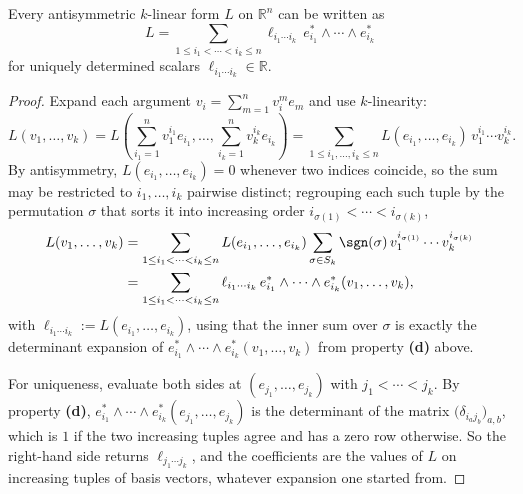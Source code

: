 \begin{proposition}
\label{prop:k_form_basis_expansion}
Every antisymmetric $k$-linear form $L$ on $\mathbb{R}^n$ can be written as
\[L = \sum_{1\leq i_1<\cdots<i_k\leq n} \ell_{i_1\cdots i_k}\,e_{i_1}^*\wedge\cdots\wedge
  e_{i_k}^*\]
for uniquely determined scalars $\ell_{i_1\cdots i_k} \in \mathbb{R}$.
\end{proposition}

\begin{proof}
Expand each argument $v_i = \sum_{m=1}^n v_i^m e_m$ and use $k$-linearity:
\[L(v_1,\ldots,v_k) = L\!\left(\sum_{i_1=1}^n v_1^{i_1}e_{i_1},\ldots,\sum_{i_k=1}^n
  v_k^{i_k}e_{i_k}\right) = \sum_{1\leq i_1,\ldots,i_k\leq n} L(e_{i_1},\ldots,e_{i_k})\,
  v_1^{i_1}\cdots v_k^{i_k}.\]
By antisymmetry, $L(e_{i_1},\ldots,e_{i_k}) = 0$ whenever two indices coincide, so the sum may
be restricted to $i_1,\ldots,i_k$ pairwise distinct; regrouping each such tuple by the
permutation $\sigma$ that sorts it into increasing order $i_{\sigma(1)}<\cdots<i_{\sigma(k)}$,
\begin{align}
L(v_1,\ldots,v_k) &= \sum_{1\leq i_1<\cdots<i_k\leq n} L(e_{i_1},\ldots,e_{i_k})
  \sum_{\sigma\in S_k} \sgn(\sigma)\,v_1^{i_{\sigma(1)}}\cdots v_k^{i_{\sigma(k)}} \nonumber \\
  &= \sum_{1\leq i_1<\cdots<i_k\leq n} \ell_{i_1\cdots i_k}\,e_{i_1}^*\wedge\cdots\wedge
  e_{i_k}^*(v_1,\ldots,v_k), \nonumber
\end{align}
with $\ell_{i_1\cdots i_k} := L(e_{i_1},\ldots,e_{i_k})$, using that the inner sum over $\sigma$
is exactly the determinant expansion of $e_{i_1}^*\wedge\cdots\wedge e_{i_k}^*(v_1,\ldots,v_k)$
from property \textbf{(d)} above.

For uniqueness, evaluate both sides at $(e_{j_1},\ldots,e_{j_k})$ with $j_1 < \cdots < j_k$. By
property \textbf{(d)}, $e_{i_1}^*\wedge\cdots\wedge e_{i_k}^*(e_{j_1},\ldots,e_{j_k})$ is the
determinant of the matrix $\big(\delta_{i_a j_b}\big)_{a,b}$, which is $1$ if the two increasing
tuples agree and has a zero row otherwise. So the right-hand side returns
$\ell_{j_1\cdots j_k}$, and the coefficients are the values of $L$ on increasing tuples of basis
vectors, whatever expansion one started from.
\end{proof}

